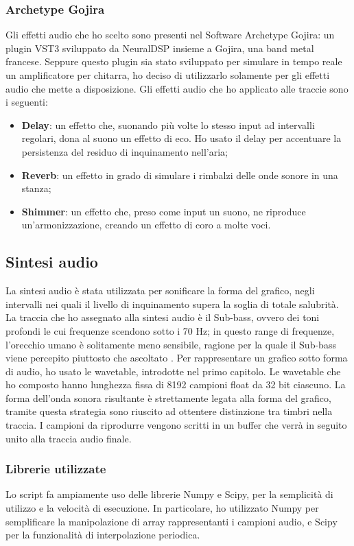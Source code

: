 \subsubsection{Archetype Gojira}
Gli effetti audio che ho scelto sono presenti nel Software Archetype Gojira: un plugin VST3 sviluppato da NeuralDSP insieme a Gojira, una band metal francese.
Seppure questo plugin sia stato sviluppato per simulare in tempo reale un amplificatore per chitarra, ho deciso di utilizzarlo solamente per gli effetti audio che mette a disposizione.
Gli effetti audio che ho applicato alle traccie sono i seguenti:
\begin{itemize}
    \item \textbf{Delay}: un effetto che, suonando più volte lo stesso input ad intervalli regolari, dona al suono un effetto di eco. Ho usato il delay per accentuare la persistenza del residuo di inquinamento nell'aria;
    \item \textbf{Reverb}: un effetto in grado di simulare i rimbalzi delle onde sonore in una stanza;
    \item \textbf{Shimmer}: un effetto che, preso come input un suono, ne riproduce un'armonizzazione, creando un effetto di coro a molte voci.
\end{itemize}

\subsection{Sintesi audio}
La sintesi audio è stata utilizzata per sonificare la forma del grafico, negli intervalli nei quali il livello di inquinamento supera la soglia di totale salubrità.
La traccia che ho assegnato alla sintesi audio è il Sub-bass, ovvero dei toni profondi le cui frequenze scendono sotto i 70 Hz; in questo range di frequenze, l'orecchio umano è solitamente meno sensibile, ragione per la quale il Sub-bass viene percepito piuttosto che ascoltato \cite{subbass}.
Per rappresentare un grafico sotto forma di audio, ho usato le wavetable, introdotte nel primo capitolo.
Le wavetable che ho composto hanno lunghezza fissa di 8192 campioni float da 32 bit ciascuno.
La forma dell'onda sonora risultante è strettamente legata alla forma del grafico, tramite questa strategia sono riuscito ad ottentere distinzione tra timbri nella traccia.
I campioni da riprodurre vengono scritti in un buffer che verrà in seguito unito alla traccia audio finale.
\subsubsection{Librerie utilizzate}
Lo script fa ampiamente uso delle librerie Numpy e Scipy, per la semplicità di utilizzo e la velocità di esecuzione.
In particolare, ho utilizzato Numpy per semplificare la manipolazione di array rappresentanti i campioni audio, e Scipy per la funzionalità di interpolazione periodica.
